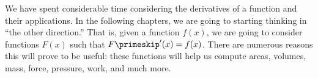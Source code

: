 
We have spent considerable time considering the derivatives of a function and their applications. In the following chapters, we are going to starting thinking in ``the other direction.'' That is, given a function $f(x)$, we are going to consider functions $F(x)$ such that $F\primeskip'(x) = f(x)$. There are numerous reasons this will prove to be useful: these functions will help us compute areas, volumes, mass, force, pressure, work, and much more.



\apexappendix


%
%
%
%


